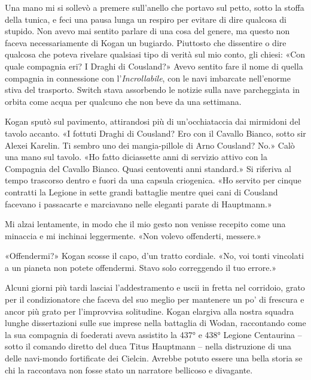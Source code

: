 Una mano mi si sollevò a premere sull'anello che portavo sul petto,
sotto la stoffa della tunica, e feci una pausa lunga un respiro per
evitare di dire qualcosa di stupido. Non avevo mai sentito parlare di
una cosa del genere, ma questo non faceva necessariamente di Kogan un
bugiardo. Piuttosto che dissentire o dire qualcosa che poteva rivelare
qualsiasi tipo di verità sul mio conto, gli chiesi: «Con quale compagnia
eri? I Draghi di Cousland?» Avevo sentito fare il nome di quella
compagnia in connessione con l'\emph{Incrollabile}, con le navi
imbarcate nell'enorme stiva del trasporto. Switch stava assorbendo le
notizie sulla nave parcheggiata in orbita come acqua per qualcuno che
non beve da una settimana.

Kogan sputò sul pavimento, attirandosi più di un'occhiataccia dai
mirmidoni del tavolo accanto. «I fottuti Draghi di Cousland? Ero con il
Cavallo Bianco, sotto sir Alexei Karelin. Ti sembro uno dei
mangia-pillole di Arno Cousland? No.» Calò una mano sul tavolo. «Ho
fatto diciassette anni di servizio attivo con la Compagnia del Cavallo
Bianco. Quasi centoventi anni standard.» Si riferiva al tempo trascorso
dentro e fuori da una capsula criogenica. «Ho servito per cinque
contratti la Legione in sette grandi battaglie mentre quei cani di
Cousland facevano i passacarte e marciavano nelle eleganti parate di
Hauptmann.»

Mi alzai lentamente, in modo che il mio gesto non venisse {recepito}
come una minaccia e mi inchinai leggermente. «Non volevo offenderti,
messere.»

«Offendermi?» Kogan scosse il capo, d'un tratto cordiale. «No, voi tonti
vincolati a un pianeta non potete offendermi. Stavo solo correggendo il
tuo errore.»

\begin{figure}
	\centering
	\def\svgwidth{\columnwidth}
	\scalebox{0.2}{}
\end{figure}

Alcuni giorni più tardi lasciai l'addestramento e uscii in fretta nel
corridoio, grato per il condizionatore che faceva del suo meglio per
mantenere un po' di frescura e ancor più grato per l'improvvisa
solitudine. Kogan elargiva alla nostra squadra lunghe dissertazioni
sulle sue imprese nella battaglia di Wodan, raccontando come la sua
compagnia di foederati aveva assistito la 437° e 438° Legione Centaurina
-- sotto il comando diretto del duca Titus Hauptmann -- nella
distruzione di una delle navi-mondo fortificate dei Cielcin. Avrebbe
potuto essere una bella storia se chi la raccontava non fosse stato un
narratore bellicoso e divagante.


